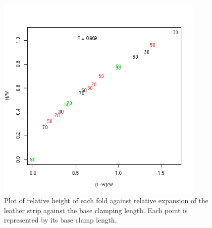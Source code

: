 %

\begin{figure}[!h]
  \centering
   \includegraphics[width=0.9\textwidth]{HLplot.png}
  \caption{Plot of relative height of each fold against relative expansion of the leather strip against the base clamping length. Each point is represented by its base clamp length.}
  \label{fig:hlplot}
\end{figure}

%

